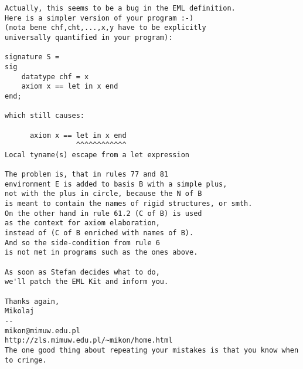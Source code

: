 \documentclass[12pt,a4paper]{article}
\begin{document}
{\begin{verbatim}
Actually, this seems to be a bug in the EML definition.
Here is a simpler version of your program :-)
(nota bene chf,cht,...,x,y have to be explicitly 
universally quantified in your program):

signature S = 
sig 
    datatype chf = x
    axiom x == let in x end
end;

which still causes:

      axiom x == let in x end
                 ^^^^^^^^^^^^
Local tyname(s) escape from a let expression

The problem is, that in rules 77 and 81 
environment E is added to basis B with a simple plus,
not with the plus in circle, because the N of B
is meant to contain the names of rigid structures, or smth.
On the other hand in rule 61.2 (C of B) is used 
as the context for axiom elaboration,
instead of (C of B enriched with names of B).
And so the side-condition from rule 6
is not met in programs such as the ones above.

As soon as Stefan decides what to do,
we'll patch the EML Kit and inform you.

Thanks again,
Mikolaj
-- 
mikon@mimuw.edu.pl
http://zls.mimuw.edu.pl/~mikon/home.html
The one good thing about repeating your mistakes is that you know when
to cringe.
\end{verbatim}}
\end{document}
